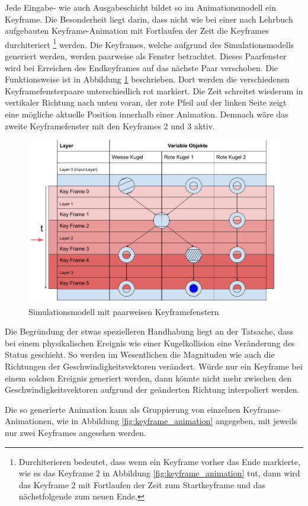 Jede Eingabe- wie auch Ausgabeschicht bildet so im Animationsmodell ein Keyframe. Die Besonderheit liegt darin, dass
nicht wie bei einer nach Lehrbuch aufgebauten Keyframe-Animation mit Fortlaufen der Zeit die Keyframes durchiteriert
\footnote{Durchiterieren bedeutet, dass wenn ein Keyframe vorher das Ende markierte, wie es das Keyframe 2 in Abbildung \ref{fig:keyframe_animation} tut, dann wird
das Keyframe 2 mit Fortlaufen der Zeit zum Startkeyframe und das nächstfolgende zum neuen Ende.} werden. Die Keyframes, welche aufgrund
des Simulationsmodells generiert werden, werden paarweise als Fenster betrachtet. Dieses Paarfenster wird bei Erreichen
des Endkeyframes auf das nächste Paar verschoben. Die Funktionsweise ist in Abbildung \ref{fig:simulationsmodell_keyframe_paare}
beschrieben. Dort werden die verschiedenen Keyframefensterpaare unterschiedlich rot markiert. Die Zeit schreitet wiederum in
vertikaler Richtung nach unten voran, der rote Pfeil auf der linken Seite zeigt eine mögliche aktuelle Position innerhalb
einer Animation. Demnach wäre das zweite Keyframefenster mit den Keyframes 2 und 3 aktiv.

\begin{figure}[h!]
    \begin{center}
        \includegraphics[width=0.6\linewidth]{../common/03_billiard_ai/resources/32_simulation_animationfenster.png}
    \end{center}
    \caption{Simulationsmodell mit paarweisen Keyframefenstern}
    \label{fig:simulationsmodell_keyframe_paare}
\end{figure}

Die Begründung der etwas spezielleren Handhabung liegt an der Tatsache, dass bei einem physikalischen Ereignis wie
einer Kugelkollision eine Veränderung des Status geschieht. So werden im Wesentlichen die Magnituden wie auch die
Richtungen der Geschwindigkeitsvektoren verändert. Würde nur ein Keyframe bei einem solchen Ereignis generiert werden,
dann könnte nicht mehr zwischen den Geschwindigkeitsvektoren aufgrund der geänderten Richtung interpoliert werden.

Die so generierte Animation kann als Gruppierung von einzelnen Keyframe-Animationen, wie in Abbildung \ref{fig:keyframe_animation}
angegeben, mit jeweils nur zwei Keyframes angesehen werden.